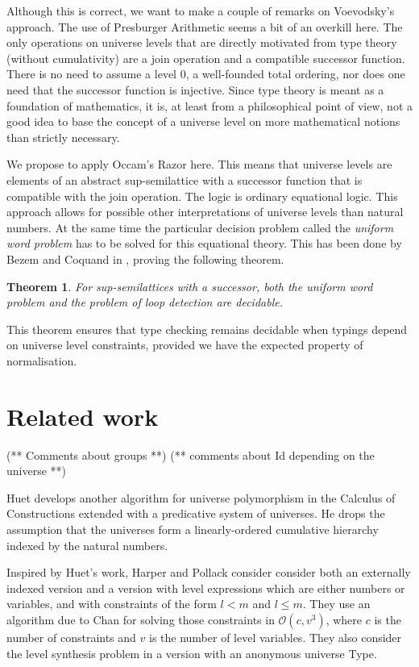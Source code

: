 \documentclass[11pt,a4paper]{article}
\newtheorem{theorem}{Theorem}[section]
\theoremstyle{definition}
\newcommand{\Ordo}{\mathcal{O}}
\begin{document}
Although this is correct, we want to make a couple of remarks on Voevodsky's approach.
The use of Presburger Arithmetic seems a bit of an overkill here.
The only operations on universe levels that are directly motivated
from type theory (without cumulativity) are a join operation and a compatible successor function.
There is no need to assume a level 0, a well-founded total ordering,
nor does one need that the successor function is injective.
Since type theory is meant as a foundation of mathematics, it is,
at least from a philosophical point of view,
not a good idea to base the concept of a universe level
on more mathematical notions than strictly necessary.

We propose to apply Occam's Razor here. This means that universe levels
are elements of an abstract sup-semilattice with a successor function
that is compatible with the join operation. The logic is ordinary
equational logic.
This approach allows for possible other interpretations of universe levels
than natural numbers. At the same time the particular decision problem
called the \emph{uniform word problem} has to be solved for this equational theory.
This has been done by Bezem and Coquand in \cite{bezem-coquand:lattices},
proving the following theorem.

\begin{theorem}\label{thm:P-solvability}
For sup-semilattices with a successor, both the uniform word problem
and the problem of loop detection are decidable.
\end{theorem}
This theorem ensures that type checking remains decidable when
typings depend on universe level constraints, provided we have the expected property of normalisation.


\section{Related work}

(** Comments about groups **)
(** comments about Id depending on the universe **)

Huet \cite{Huet87} develops another algorithm for universe polymorphism
in the Calculus of Constructions extended with a predicative system of universes.
He drops the assumption that the universes form a linearly-ordered cumulative hierarchy indexed by the natural numbers.

Inspired by Huet's work, Harper and Pollack
\cite{HarperP91} consider consider both an externally indexed version and a version
with level expressions which are either numbers or variables, and with constraints of the form $l < m$ and $l \leq m$. They use an algorithm due to Chan
for solving those constraints in $\Ordo(c,v^3)$, where $c$ is the number of constraints and $v$ is the number of level variables. They also consider the level synthesis problem in a version with an anonymous universe Type.
\end{document}
